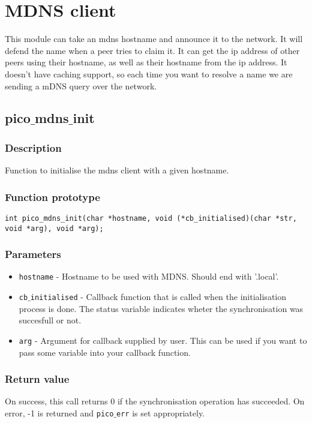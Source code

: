 \section{MDNS client}

This module can take an mdns hostname and announce it to the network. It will defend the name when
a peer tries to claim it. It can get the ip address of other peers using their hostname, as well as their hostname from the ip address.
It doesn't have caching support, so each time you want to resolve a name we are sending a mDNS query over the network. 

\subsection{pico$\_$mdns$\_$init}

\subsubsection*{Description}
Function to initialise the mdns client with a given hostname.
\subsubsection*{Function prototype}
\begin{verbatim}
int pico_mdns_init(char *hostname, void (*cb_initialised)(char *str, void *arg), void *arg);
\end{verbatim}

\subsubsection*{Parameters}
\begin{itemize}[noitemsep]
\item \texttt{hostname} - Hostname to be used with MDNS. Should end with '.local'.
\item \texttt{cb$\_$initialised} - Callback function that is called when the initialisation process is done. The status variable indicates wheter the synchronisation was succesfull or not.
\item \texttt{arg} - Argument for callback supplied by user. This can be used if you want to pass some variable into your callback function.
\end{itemize}

\subsubsection*{Return value}
On success, this call returns 0 if the synchronisation operation has succeeded.
On error, -1 is returned and \texttt{pico$\_$err} is set appropriately.

